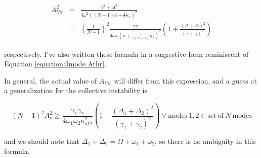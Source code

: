 \begin{eqnarray}
A_{thr}^2 & = & \frac{\gamma^2 + \Delta^2}{4\omega^2((N-1)\kappa + \frac{1}{2}\kappa_s)^2} \\
          & = & \left(\frac{1}{N-1}\right)^2\frac{\gamma\gamma}{4\omega\omega(\kappa + \frac{1}{2(N-1)}\kappa_s)^2}\left( 1 + \frac{(\Delta+\Delta)^2}{(\gamma+\gamma)^2}\right)
\end{eqnarray}

respectively. I've also written these formula in a suggestive form reminiscent of Equation \ref{equation:3mode Athr}.

In general, the actual value of $A_{thr}$ will differ from this expression, and a guess at a generalization for the collective instability is

\begin{equation}
(N-1)^2 A_o^2 \geq \frac{\gamma_1 \gamma_2}{4\omega_1\omega_2\kappa_{o12}^2}\left( 1 + \frac{(\Delta_1+\Delta_2)^2}{(\gamma_1+\gamma_2)^2}\right) \ \forall\ \mathrm{modes} \ 1,2 \in \mathrm{set\ of}\ N \ \mathrm{modes}
\end{equation}

and we should note that $\Delta_1+\Delta_2 = \Omega+\omega_1+\omega_2$, so there is no ambiguity in this formula.

